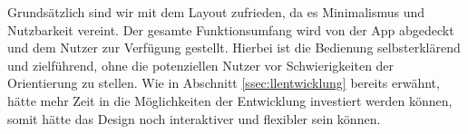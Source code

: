 Grundsätzlich sind wir mit dem Layout zufrieden, da es Minimalismus und Nutzbarkeit vereint. Der gesamte Funktionsumfang wird von der App abgedeckt und dem Nutzer zur Verfügung gestellt. Hierbei ist die Bedienung selbsterklärend und zielführend, ohne die potenziellen Nutzer vor Schwierigkeiten der Orientierung zu stellen. Wie in Abschnitt \ref{ssec:llentwicklung} bereits erwähnt, hätte mehr Zeit in die Möglichkeiten der Entwicklung investiert werden können, somit hätte das Design noch interaktiver und flexibler sein können. 
